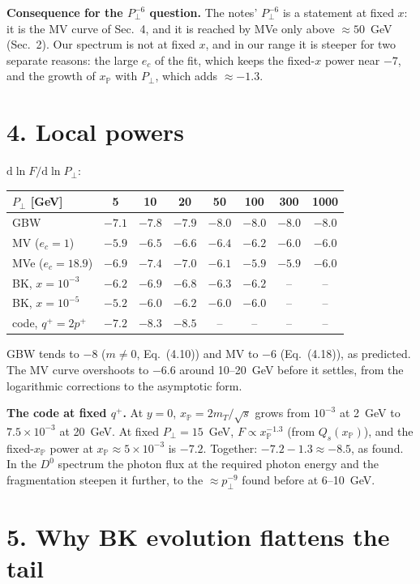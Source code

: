 \documentclass[12pt]{article}
\newcommand{\xpo}{x_{\mathbb{P}}}
\begin{document}
\textbf{Consequence for the $P_\perp^{-6}$ question.} The notes' $P_\perp^{-6}$ is a statement at fixed $x$: it is
the MV curve of Sec.~4, and it is reached by MVe only above $\approx50$~GeV (Sec.~2). Our spectrum is not at fixed $x$, and in
our range it is steeper for two separate reasons: the large $e_c$ of the fit, which keeps the fixed-$x$ power near
$-7$, and the growth of $\xpo$ with $P_\perp$, which adds $\approx-1.3$.

\section*{4. Local powers}

$\mathrm{d}\ln F/\mathrm{d}\ln P_\perp$:
\begin{center}
\begin{tabular}{l|ccccccc}
\toprule
$P_\perp$ [GeV] & 5 & 10 & 20 & 50 & 100 & 300 & 1000 \\
\midrule
GBW                 & $-7.1$ & $-7.8$ & $-7.9$ & $-8.0$ & $-8.0$ & $-8.0$ & $-8.0$ \\
MV ($e_c=1$)        & $-5.9$ & $-6.5$ & $-6.6$ & $-6.4$ & $-6.2$ & $-6.0$ & $-6.0$ \\
MVe ($e_c=18.9$)    & $-6.9$ & $-7.4$ & $-7.0$ & $-6.1$ & $-5.9$ & $-5.9$ & $-6.0$ \\
BK, $x=10^{-3}$     & $-6.2$ & $-6.9$ & $-6.8$ & $-6.3$ & $-6.2$ & -- & -- \\
BK, $x=10^{-5}$     & $-5.2$ & $-6.0$ & $-6.2$ & $-6.0$ & $-6.0$ & -- & -- \\
code, $q^+=2p^+$    & $-7.2$ & $-8.3$ & $-8.5$ & -- & -- & -- & -- \\
\bottomrule
\end{tabular}
\end{center}
GBW tends to $-8$ ($m\neq0$, Eq.~(4.10)) and MV to $-6$ (Eq.~(4.18)), as predicted. The MV curve
overshoots to $-6.6$ around 10--20~GeV before it settles, from the logarithmic corrections to the asymptotic form.

\textbf{The code at fixed $q^+$.} At $y=0$, $\xpo=2m_T/\sqrt s$ grows from $10^{-3}$ at 2~GeV to $7.5\times10^{-3}$
at 20~GeV. At fixed $P_\perp=15$~GeV, $F\propto\xpo^{-1.3}$ (from $Q_s(\xpo)$), and the fixed-$\xpo$ power at
$\xpo\approx5\times10^{-3}$ is $-7.2$. Together: $-7.2-1.3\approx-8.5$, as found. In the $D^0$ spectrum the
photon flux at the required photon energy and the fragmentation steepen it further, to the
$\approx p_\perp^{-9}$ found before at 6--10~GeV.

\section*{5. Why BK evolution flattens the tail}
\end{document}
